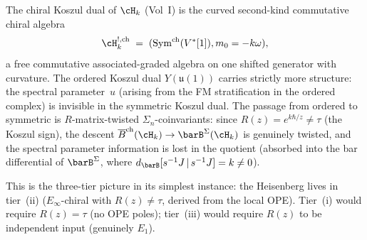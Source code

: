 \begin{remark}
\label{rem:heisenberg-chiral-vs-ordered}
The chiral Koszul dual of $\cH_k$ (Vol~I) is the curved
second-kind commutative chiral algebra
\[
\cH_k^{!,\mathrm{ch}}
\;=\;
(\operatorname{Sym}^{\mathrm{ch}}(V^*[1]),m_0=-k\omega),
\]
a free commutative associated-graded algebra on one shifted
generator with curvature.
The ordered Koszul dual $Y(\mathfrak{u}(1))$ carries
strictly more structure: the spectral parameter~$u$
(arising from the FM stratification in the ordered
complex) is invisible in the symmetric Koszul dual.
The passage from ordered to symmetric is
$R$-matrix-twisted $\Sigma_n$-coinvariants: since
$R(z) = e^{k\hbar/z} \neq \tau$ (the Koszul sign),
the descent $\Barch(\cH_k)\to\barB^{\Sigma}(\cH_k)$
is genuinely twisted, and the spectral parameter
information is lost in the quotient (absorbed into
the bar differential of $\barB^{\Sigma}$, where
$d_{\barB}[\susp^{-1}J\,|\,\susp^{-1}J] = k \neq 0$).

This is the three-tier picture in its simplest instance:
the Heisenberg lives in tier~(ii)
($E_\infty$-chiral with $R(z)\neq\tau$, derived from
the local OPE). Tier~(i) would require $R(z) = \tau$
(no OPE poles); tier~(iii) would require $R(z)$ to be
independent input (genuinely $E_1$).
\end{remark}

